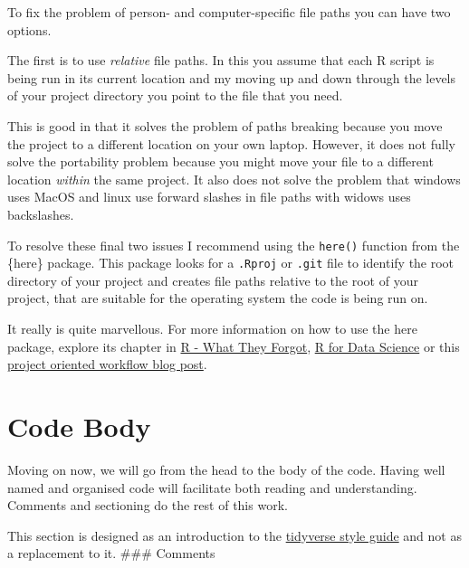 \documentclass[
  12pt,
]{book}
\begin{document}
To fix the problem of person- and computer-specific file paths you can have two options.

The first is to use \emph{relative} file paths. In this you assume that each R script is being run in its current location and my moving up and down through the levels of your project directory you point to the file that you need.

This is good in that it solves the problem of paths breaking because you move the project to a different location on your own laptop. However, it does not fully solve the portability problem because you might move your file to a different location \emph{within} the same project. It also does not solve the problem that windows uses MacOS and linux use forward slashes in file paths with widows uses backslashes.

To resolve these final two issues I recommend using the \texttt{here()} function from the \{here\} package. This package looks for a \texttt{.Rproj} or \texttt{.git} file to identify the root directory of your project and creates file paths relative to the root of your project, that are suitable for the operating system the code is being run on.

It really is quite marvellous. For more information on how to use the here package, explore its chapter in \href{https://rstats.wtf/project-oriented-workflow.html}{R - What They Forgot}, \href{https://r4ds.had.co.nz/workflow-projects.html}{R for Data Science} or this \href{https://www.tidyverse.org/blog/2017/12/workflow-vs-script/}{project oriented workflow blog post}.

\hypertarget{code-body}{%
\section{Code Body}\label{code-body}}

Moving on now, we will go from the head to the body of the code. Having well named and organised code will facilitate both reading and understanding. Comments and sectioning do the rest of this work.

This section is designed as an introduction to the \href{https://style.tidyverse.org/}{tidyverse style guide} and not as a replacement to it.
\#\#\# Comments
\end{document}
